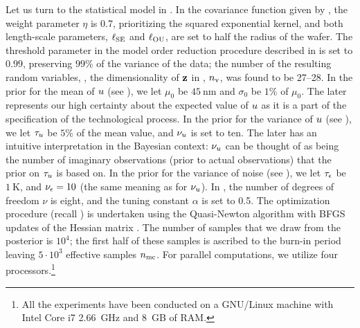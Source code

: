 Let us turn to the statistical model in . In the covariance function given by , the weight parameter $\eta$ is 0.7, prioritizing the squared exponential kernel, and both length-scale parameters, $\ell_{\text{SE}}$ and $\ell_{\text{OU}}$, are set to half the radius of the wafer. The threshold parameter in the model order reduction procedure described in  is set to $0.99$, preserving $99\%$ of the variance of the data; the number of the resulting random variables, \ie, the dimensionality of $\mathbf{z}$ in , ${n_\text{v}}$, was found to be 27--28.
In the prior for the mean of $u$ (see ), we let $\mu_0$ be $45~\text{nm}$ and $\sigma_0$ be $1\%$ of $\mu_0$. The later represents our high certainty about the expected value of $u$ as it is a part of the specification of the technological process.
In the prior for the variance of $u$ (see ), we let $\tau_u$ be $5\%$ of the mean value, and $\nu_u$ is set to ten. The later has an intuitive interpretation in the Bayesian context: $\nu_u$ can be thought of as being the number of imaginary observations (prior to actual observations) that the prior on $\tau_u$ is based on.
In the prior for the variance of noise (see ), we let $\tau_\epsilon$ be $1~\text{K}$, and $\nu_\epsilon = 10$ (the same meaning as for $\nu_u$).
In , the number of degrees of freedom $\nu$ is eight, and the tuning constant $\alpha$ is set to 0.5.
The optimization procedure (recall ) is undertaken using the Quasi-Newton algorithm with BFGS updates of the Hessian matrix \cite{press2007}.
The number of samples that we draw from the posterior is $10^4$; the first half of these samples is ascribed to the burn-in period leaving $5 \cdot 10^3$ effective samples ${n_\text{mc}}$.
For parallel computations, we utilize four processors.\footnote{All the experiments have been conducted on a GNU/Linux machine with Intel Core i7 2.66~GHz and 8~GB of RAM.}

